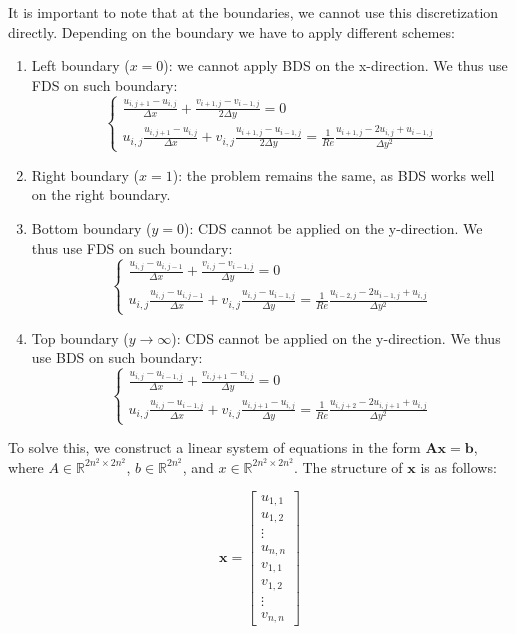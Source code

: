 \documentclass{article}
\begin{document}
It is important to note that at the boundaries, we cannot use this discretization directly. Depending on the boundary we have to apply different schemes:
\begin{enumerate}
  \item Left boundary (\( x = 0 \)): we cannot apply BDS on the x-direction. We thus use FDS on such boundary:
  \[
\begin{cases}
  \frac{u_{i,j+1} - u_{i,j}}{\Delta x} + \frac{v_{i+1,j} - v_{i-1,j}}{2 \Delta y} = 0 \\
  u_{i,j}\frac{u_{i,j+1} - u_{i,j}}{\Delta x}  + v_{i,j} \frac{u_{i+1,j} - u_{i-1,j}}{2 \Delta y} = \frac{1}{Re} \frac{u_{i+1,j} - 2u_{i,j} + u_{i-1,j}}{\Delta y^2}
\end{cases}
\]
  
\item Right boundary (\( x = 1 \)): the problem remains the same, as BDS works well on the right boundary.
  
\item Bottom boundary (\( y = 0 \)): CDS cannot be applied on the y-direction. We thus use FDS on such boundary:
\[
  \begin{cases}
    \frac{u_{i,j} - u_{i,j-1}}{\Delta x} + \frac{v_{i,j} - v_{i-1,j}}{\Delta y} = 0 \\
    u_{i,j}\frac{u_{i,j} - u_{i,j-1}}{\Delta x}  + v_{i,j} \frac{u_{i,j} - u_{i-1,j}}{\Delta y} = \frac{1}{Re} \frac{u_{i-2,j} - 2u_{i-1,j} + u_{i,j}}{\Delta y^2}
  \end{cases}
\]
  
\item Top boundary (\( y \to \infty \)): CDS cannot be applied on the y-direction. We thus use BDS on such boundary:
\[
  \begin{cases}
    \frac{u_{i,j} - u_{i-1,j}}{\Delta x} + \frac{v_{i,j+1} - v_{i,j}}{\Delta y} = 0 \\
    u_{i,j}\frac{u_{i,j} - u_{i-1,j}}{\Delta x}  + v_{i,j} \frac{u_{i,j+1} - u_{i,j}}{\Delta y} = \frac{1}{Re} \frac{u_{i,j+2} - 2u_{i,j+1} + u_{i,j}}{\Delta y^2}
  \end{cases}
\]
\end{enumerate}

To solve this, we construct a linear system of equations in the form \( \mathbf{A} \mathbf{x} = \mathbf{b} \), where \( A \in \mathbb{R}^{2n^2 \times 2n^2} \), \( b \in \mathbb{R}^{2n^2} \), and \( x \in \mathbb{R}^{2n^2 \times 2n^2} \). The structure of \( \mathbf{x} \) is as follows:

\[
\mathbf{x} = \begin{bmatrix}
u_{1,1} \\
u_{1,2} \\
\vdots \\
u_{n,n} \\
v_{1,1} \\
v_{1,2} \\
\vdots \\
v_{n,n}
\end{bmatrix}
\]
\end{document}
